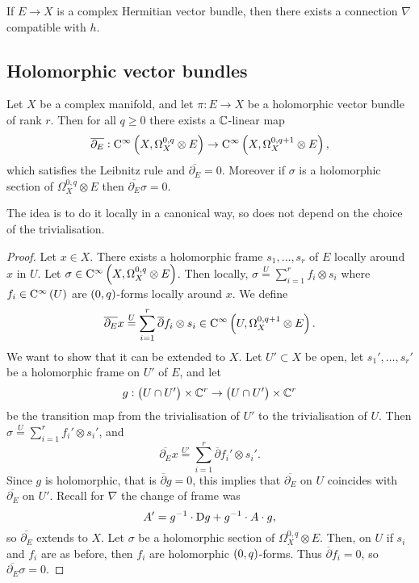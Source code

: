 \begin{theorem}
If $ E \to X $ is a complex Hermitian vector bundle, then there exists a connection $ \nabla $ compatible with $ h $.
\end{theorem}

\subsection{Holomorphic vector bundles}


\begin{proposition}
\label{prop:5.9}
Let $ X $ be a complex manifold, and let $ \pi : E \to X $ be a holomorphic vector bundle of rank $ r $. Then for all $ q \ge 0 $ there exists a $ \mathbb{C} $-linear map
$$ \overline{\partial_E} : \C^\infty\br{X, \Omega_X^{0, q} \otimes E} \to \C^\infty\br{X, \Omega_X^{0, q + 1} \otimes E}, $$
which satisfies the Leibnitz rule and $ \overline{\partial_E} = 0 $. Moreover if $ \sigma $ is a holomorphic section of $ \Omega_X^{0, q} \otimes E $ then $ \overline{\partial_E}\sigma = 0 $.
\end{proposition}

\pagebreak

The idea is to do it locally in a canonical way, so does not depend on the choice of the trivialisation.

\begin{proof}
Let $ x \in X $. There exists a holomorphic frame $ s_1, \dots, s_r $ of $ E $ locally around $ x $ in $ U $. Let $ \sigma \in \C^\infty\br{X, \Omega_X^{0, q} \otimes E} $. Then locally, $ \sigma \overset{U}{=} \sum_{i = 1}^r f_i \otimes s_i $ where $ f_i \in \C^\infty\br{U} $ are $ \br{0, q} $-forms locally around $ x $. We define
$$ \overline{\partial_E}x \overset{U}{=} \sum_{i = 1}^r \overline{\partial}f_i \otimes s_i \in \C^\infty\br{U, \Omega_X^{0, q + 1} \otimes E}. $$
We want to show that it can be extended to $ X $. Let $ U' \subset X $ be open, let $ s_1', \dots, s_r' $ be a holomorphic frame on $ U' $ of $ E $, and let
$$ g : \br{U \cap U'} \times \CC^r \to \br{U \cap U'} \times \CC^r $$
be the transition map from the trivialisation of $ U' $ to the trivialisation of $ U $. Then $ \sigma \overset{U}{=} \sum_{i = 1}^r f_i' \otimes s_i' $, and
$$ \overline{\partial_E}x \overset{U'}{=} \sum_{i = 1}^r \overline{\partial}f_i' \otimes s_i'. $$
Since $ g $ is holomorphic, that is $ \overline{\partial}g = 0 $, this implies that $ \overline{\partial_E} $ on $ U $ coincides with $ \overline{\partial_E} $ on $ U' $. Recall for $ \nabla $ the change of frame was
$$ A' = g^{-1} \cdot \mathrm{D} g + g^{-1} \cdot A \cdot g, $$
so $ \overline{\partial_E} $ extends to $ X $. Let $ \sigma $ be a holomorphic section of $ \Omega_X^{0, q} \otimes E $. Then, on $ U $ if $ s_i $ and $ f_i $ are as before, then $ f_i $ are holomorphic $ \br{0, q} $-forms. Thus $ \overline{\partial}f_i = 0 $, so $ \overline{\partial_E}\sigma = 0 $.
\end{proof}

